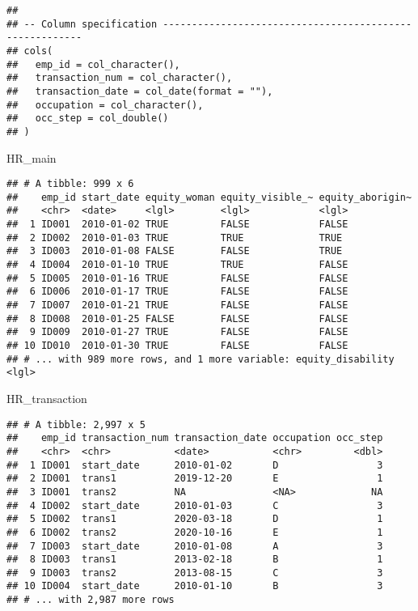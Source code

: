 \documentclass[
]{article}
\newenvironment{Shaded}{\begin{snugshade}}{\end{snugshade}}
\newcommand{\NormalTok}[1]{#1}
\begin{document}
\begin{verbatim}
## 
## -- Column specification --------------------------------------------------------
## cols(
##   emp_id = col_character(),
##   transaction_num = col_character(),
##   transaction_date = col_date(format = ""),
##   occupation = col_character(),
##   occ_step = col_double()
## )
\end{verbatim}

\begin{Shaded}
\begin{Highlighting}[]
\NormalTok{HR\_main}
\end{Highlighting}
\end{Shaded}

\begin{verbatim}
## # A tibble: 999 x 6
##    emp_id start_date equity_woman equity_visible_~ equity_aborigin~
##    <chr>  <date>     <lgl>        <lgl>            <lgl>           
##  1 ID001  2010-01-02 TRUE         FALSE            FALSE           
##  2 ID002  2010-01-03 TRUE         TRUE             TRUE            
##  3 ID003  2010-01-08 FALSE        FALSE            TRUE            
##  4 ID004  2010-01-10 TRUE         TRUE             FALSE           
##  5 ID005  2010-01-16 TRUE         FALSE            FALSE           
##  6 ID006  2010-01-17 TRUE         FALSE            FALSE           
##  7 ID007  2010-01-21 TRUE         FALSE            FALSE           
##  8 ID008  2010-01-25 FALSE        FALSE            FALSE           
##  9 ID009  2010-01-27 TRUE         FALSE            FALSE           
## 10 ID010  2010-01-30 TRUE         FALSE            FALSE           
## # ... with 989 more rows, and 1 more variable: equity_disability <lgl>
\end{verbatim}

\begin{Shaded}
\begin{Highlighting}[]
\NormalTok{HR\_transaction}
\end{Highlighting}
\end{Shaded}

\begin{verbatim}
## # A tibble: 2,997 x 5
##    emp_id transaction_num transaction_date occupation occ_step
##    <chr>  <chr>           <date>           <chr>         <dbl>
##  1 ID001  start_date      2010-01-02       D                 3
##  2 ID001  trans1          2019-12-20       E                 1
##  3 ID001  trans2          NA               <NA>             NA
##  4 ID002  start_date      2010-01-03       C                 3
##  5 ID002  trans1          2020-03-18       D                 1
##  6 ID002  trans2          2020-10-16       E                 1
##  7 ID003  start_date      2010-01-08       A                 3
##  8 ID003  trans1          2013-02-18       B                 1
##  9 ID003  trans2          2013-08-15       C                 3
## 10 ID004  start_date      2010-01-10       B                 3
## # ... with 2,987 more rows
\end{verbatim}
\end{document}
